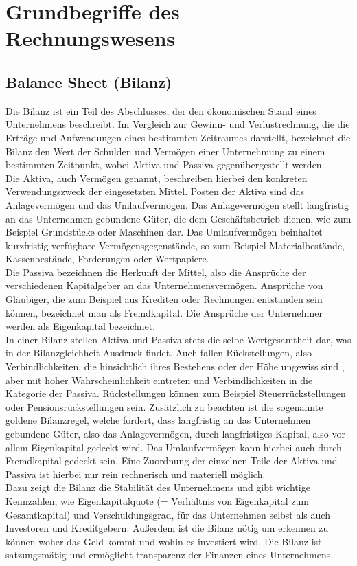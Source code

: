 \section{Grundbegriffe des Rechnungswesens}

\subsection{Balance Sheet (Bilanz)}
Die Bilanz ist ein Teil des Abschlusses, der den ökonomischen Stand eines Unternehmens beschreibt. Im Vergleich zur Gewinn- und Verlustrechnung, die die Erträge und Aufwendungen eines bestimmten Zeitraumes darstellt, bezeichnet die Bilanz den Wert der Schulden und Vermögen einer Unternehmung zu einem bestimmten Zeitpunkt, wobei Aktiva und Passiva gegenübergestellt werden.\cite{businesson}
\\
Die Aktiva, auch Vermögen genannt, beschreiben hierbei den konkreten Verwendungszweck der eingesetzten Mittel. Posten der Aktiva sind das Anlagevermögen und das Umlaufvermögen. Das Anlagevermögen stellt langfristig an das Unternehmen gebundene Güter, die dem Geschäftsbetrieb dienen, wie zum Beispiel Grundstücke oder Maschinen dar. Das Umlaufvermögen beinhaltet kurzfristig verfügbare Vermögensgegenstände, so zum Beispiel Materialbestände, Kassenbestände, Forderungen oder Wertpapiere.
\\
Die Passiva bezeichnen die Herkunft der Mittel, also die Ansprüche der verschiedenen Kapitalgeber an das Unternehmensvermögen. Ansprüche von Gläubiger, die zum Beispiel aus Krediten oder Rechnungen entstanden sein können, bezeichnet man als Fremdkapital. Die Ansprüche der Unternehmer werden als Eigenkapital bezeichnet.\cite{bilanz}
\\
In einer Bilanz stellen Aktiva und Passiva stets die selbe Wertgesamtheit dar, was in der Bilanzgleichheit Ausdruck findet. Auch fallen Rückstellungen, also Verbindlichkeiten, die hinsichtlich ihres Bestehens oder der Höhe ungewiss sind \cite{rueckstellung}, aber mit hoher Wahrscheinlichkeit eintreten und Verbindlichkeiten in die Kategorie der Passiva. Rückstellungen können zum Beispiel Steuerrückstellungen oder Pensionsrückstellungen sein. Zusätzlich zu beachten ist die sogenannte goldene Bilanzregel, welche fordert, dass langfristig an das Unternehmen gebundene Güter, also das Anlagevermögen, durch langfristiges Kapital, also vor allem Eigenkapital gedeckt wird. Das Umlaufvermögen kann hierbei auch durch Fremdkapital gedeckt sein. Eine Zuordnung der einzelnen Teile der Aktiva und Passiva ist hierbei nur rein rechnerisch und materiell möglich.\cite{bilanzregel}
\\
Dazu zeigt die Bilanz die Stabilität des Unternehmens und gibt wichtige Kennzahlen, wie Eigenkapitalquote (= Verhältnis von Eigenkapital zum Gesamtkapital) und Verschuldungsgrad, für das Unternehmen selbst als auch Investoren und Kreditgebern.\cite{businesson} Außerdem ist die Bilanz nötig um erkennen zu können woher das Geld kommt und wohin es investiert wird. Die Bilanz ist satzungsmäßig und ermöglicht transparenz der Finanzen eines Unternehmens.

